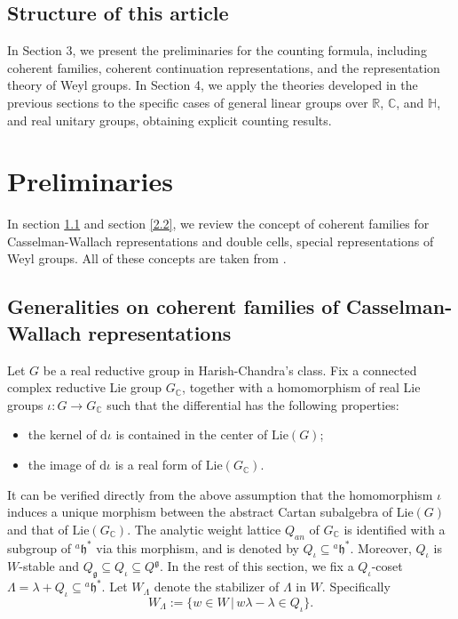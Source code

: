 \documentclass[12pt, a4paper]{amsart}
\numberwithin{equation}{section}
\newcommand{\BC}{{\mathbb {C}}}
\newcommand{\BH}{{\mathbb {H}}}
\newcommand{\BR}{{\mathbb {R}}}
\newcommand{\fg}{\mathfrak{g}}
\newcommand{\fh}{\mathfrak{h}}
\newcommand{\Lie}{{\mathrm{Lie}}}
\newcommand{\set}[2]{\{#1\,|\,#2\}}
\begin{document}
\subsection{Structure of this article}

In Section 3, we present the preliminaries for the counting formula, including coherent families, coherent continuation representations, and the representation theory of Weyl groups. In Section 4, we apply the theories developed in the previous sections to the specific cases of general linear groups over $\BR$, $\BC$, and $\BH$, and real unitary groups, obtaining explicit counting results.




\section{Preliminaries}

In section \ref{2.1} and section \ref{2.2}, we review the concept of coherent families for Casselman-Wallach representations and double cells, special representations of Weyl groups. All of these concepts are taken from \cite[Chapter 4]{BMSZ}.

\subsection{Generalities on coherent families of Casselman-Wallach representations}\label{2.1}
Let $G$ be a real reductive group in Harish-Chandra's class. Fix a connected complex reductive Lie group $G_\BC$, together with a homomorphism of real Lie groups $\iota: G \to G_\BC$ such that the differential has the following properties:
\begin{itemize}
   \item the kernel of $\mathrm{d}\iota$ is contained in the center of $\mathrm{Lie}(G)$;
   \item the image of $\mathrm{d}\iota$ is a real form of $\mathrm{Lie}(G_\BC)$.
\end{itemize}
It can be verified directly from the above assumption that the homomorphism $\iota$ induces a unique morphism between the abstract Cartan subalgebra of $\Lie(G)$ and that of $\Lie(G_{\BC})$. The analytic weight lattice $Q_{an}$ of $G_\BC$ is identified with a subgroup of ${^{a}\fh^*}$ via this morphism, and is denoted by $Q_{\iota} \subseteq  {^{a}\fh^*}$. Moreover, $Q_{\iota}$ is $W$-stable and $Q_{\fg} \subseteq Q_{\iota} \subseteq Q^{\fg}$. In the rest of this section, we fix a $Q_{\iota}$-coset $\Lambda = \lambda + Q_{\iota} \subseteq {^a\fh^*}$. Let $W_{\Lambda}$ denote the stabilizer of $\Lambda$ in $W$. Specifically 
$$W_{\Lambda} := \set{w \in W}{w\lambda - \lambda \in Q_{\iota}}.$$
\end{document}
